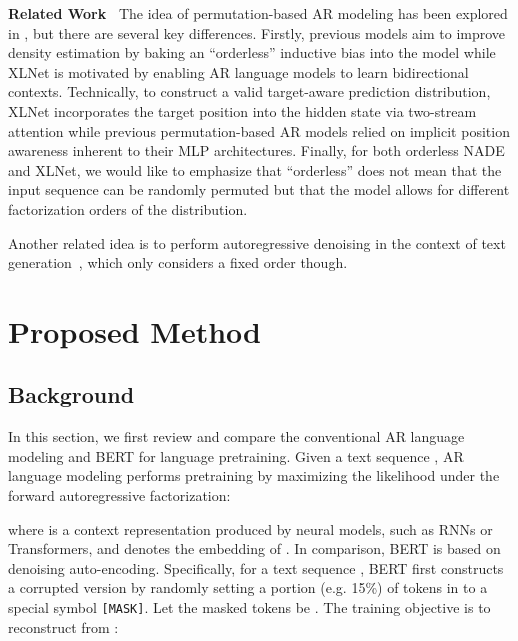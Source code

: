 \documentclass{article}
\newcommand{\mask}{\texttt{\small [MASK]}}\newcommand{\cls}{\texttt{\small [CLS]}}\newcommand{\sep}{\texttt{\small [SEP]}}\newcommand{\unk}{\texttt{unk}}
\begin{document}
\textbf{Related Work~} The idea of permutation-based AR modeling has been explored in \cite{uria2016neural,germain2015made}, but there are several key differences.
Firstly, previous models aim to improve density estimation by baking an ``orderless'' inductive bias into the model while XLNet is motivated by enabling AR language models to learn bidirectional contexts.
Technically, to construct a valid target-aware prediction distribution, XLNet incorporates the target position into the hidden state via two-stream attention while previous permutation-based AR models relied on implicit position awareness inherent to their MLP architectures.
Finally, for both orderless NADE and XLNet, we would like to emphasize that ``orderless'' does not mean that the input sequence can be randomly permuted but that the model allows for different factorization orders of the distribution.



Another related idea is to perform autoregressive denoising in the context of text generation~\cite{fedus2018maskgan}, which only considers a fixed order though.













 






 \section{Proposed Method}



\subsection{Background}
\label{sec:background}
In this section, we first review and compare the conventional AR language modeling and BERT for language pretraining.
Given a text sequence , AR language modeling performs pretraining by maximizing the likelihood under the forward autoregressive factorization:

where  is a context representation produced by neural models, such as RNNs or Transformers, and  denotes the embedding of .
In comparison, BERT is based on denoising auto-encoding.
Specifically, for a text sequence , BERT first constructs a corrupted version  by randomly setting a portion (e.g. 15\%) of tokens in  to a special symbol \mask.
Let the masked tokens be . The training objective is to reconstruct  from :
\end{document}
